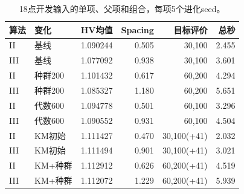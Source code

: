 \begin{table}[htbp]\centering\small
\caption{18点开发输入的单项、父项和组合，每项5个进化seed。}\label{tab:evobudget}
\begin{tabularx}{\linewidth}{lYrrrr}\toprule
算法 & 变化 & HV均值 & Spacing & 目标评价 & 总秒\\\midrule
II & 基线 & 1.090244 & 0.505 & 30,100 & 2.455\\
III & 基线 & 1.077092 & 0.938 & 30,100 & 3.601\\
II & 种群200 & 1.101432 & 0.617 & 60,200 & 4.294\\
III & 种群200 & 1.085327 & 1.180 & 60,200 & 5.651\\
II & 代数600 & 1.094778 & 0.501 & 60,100 & 3.296\\
III & 代数600 & 1.090552 & 0.931 & 60,100 & 4.504\\
II & KM初始 & 1.111427 & 0.470 & 30,100(+41) & 2.032\\
III & KM初始 & 1.111494 & 0.901 & 30,100(+41) & 3.021\\
II & KM+种群 & 1.112912 & 0.626 & 60,200(+41) & 4.519\\
III & KM+种群 & 1.112072 & 1.229 & 60,200(+41) & 5.939\\
\bottomrule\end{tabularx}
\end{table}
